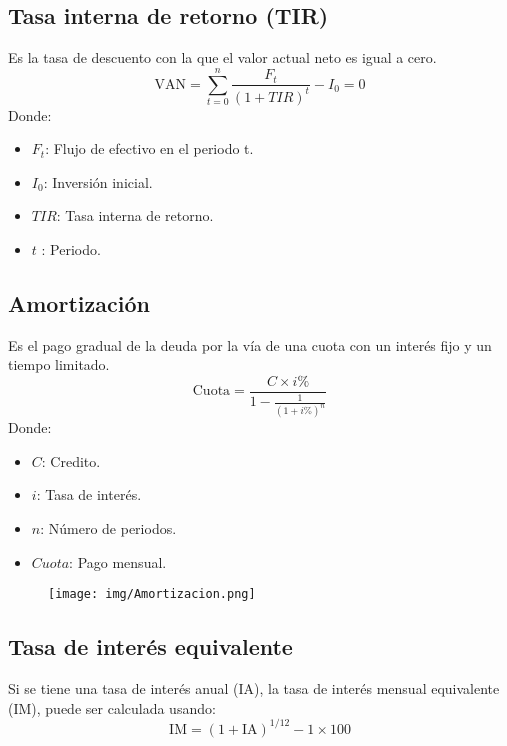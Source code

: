 \documentclass{templateNote}
\begin{document}
\newpage
\subsection*{Tasa interna de retorno (TIR)}
\noindent
Es la tasa de descuento con la que el valor actual neto es igual a cero.
\begin{equation*}
    \text{VAN} = \sum_{t=0}^{n} \frac{F_t}{(1 + TIR)^t} - I_0 = 0
\end{equation*}
Donde:
\begin{itemize}
    \item $F_t$: Flujo de efectivo en el periodo t.
    \item $I_0$: Inversión inicial.
    \item $TIR$: Tasa interna de retorno.
    \item $t$ : Periodo.
\end{itemize}

\subsection*{Amortización}
Es el pago gradual de la deuda por la vía de una cuota con un interés fijo y un tiempo limitado.
\begin{equation*}
    \text{Cuota} = \frac{C \times i\%}{1 - \frac{1}{(1 + i\%)^{n}}}
\end{equation*}
Donde:
\begin{itemize}
    \item $C$: Credito.
    \item $i$: Tasa de interés.
    \item $n$: Número de periodos.
    \item $Cuota$: Pago mensual.
\end{itemize}
\begin{figure}[H]
    \centering
    \texttt{[image: img/Amortizacion.png]}
\end{figure}

\subsection*{Tasa de interés equivalente}
Si se tiene una tasa de interés anual (IA), la tasa de interés mensual equivalente (IM), puede ser calculada usando:
\begin{equation*}
    \text{IM} = (1 + \text{IA})^{1/12} - 1 \times 100
\end{equation*}
\end{document}
